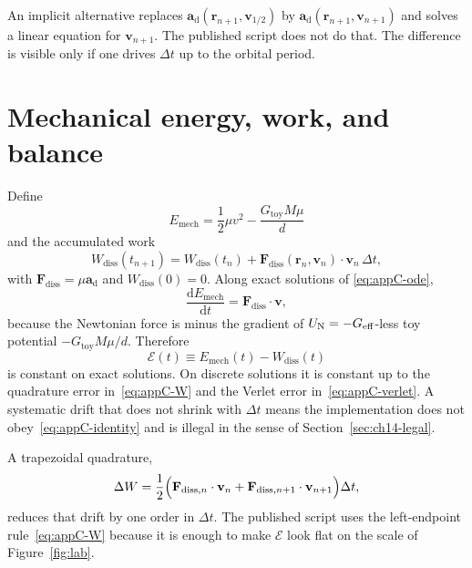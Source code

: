 An implicit alternative replaces
\(\mathbf{a}_{\mathrm{d}}(\mathbf{r}_{n+1},\mathbf{v}_{1/2})\)
by \(\mathbf{a}_{\mathrm{d}}(\mathbf{r}_{n+1},\mathbf{v}_{n+1})\)
and solves a linear equation for \(\mathbf{v}_{n+1}\). The
published script does not do that. The difference is visible only
if one drives \(\Delta t\) up to the orbital period.

\section{Mechanical energy, work, and balance}
\label{sec:appC-energy}

Define
\begin{equation}
  \label{eq:appC-E}
  E_{\mathrm{mech}}
  =\frac12\mu v^{2}-\frac{G_{\mathrm{toy}}M\mu}{d}
\end{equation}
and the accumulated work
\begin{equation}
  \label{eq:appC-W}
  W_{\mathrm{diss}}(t_{n+1})
  =W_{\mathrm{diss}}(t_n)
   +\mathbf{F}_{\mathrm{diss}}(\mathbf{r}_n,\mathbf{v}_n)
    \cdot\mathbf{v}_n\,\Delta t,
\end{equation}
with \(\mathbf{F}_{\mathrm{diss}}=\mu\mathbf{a}_{\mathrm{d}}\) and
\(W_{\mathrm{diss}}(0)=0\). Along exact solutions of
\eqref{eq:appC-ode},
\begin{equation}
  \label{eq:appC-identity}
  \frac{\mathrm{d}E_{\mathrm{mech}}}{\mathrm{d}t}
  =\mathbf{F}_{\mathrm{diss}}\cdot\mathbf{v},
\end{equation}
because the Newtonian force is minus the gradient of
\(U_{\mathrm{N}}=-G_{\mathrm{eff}}\)-less toy potential
\(-G_{\mathrm{toy}}M\mu/d\). Therefore
\begin{equation}
  \label{eq:appC-bal}
  \mathcal{E}(t)
  \equiv
  E_{\mathrm{mech}}(t)-W_{\mathrm{diss}}(t)
\end{equation}
is constant on exact solutions. On discrete solutions it is
constant up to the quadrature error in~\eqref{eq:appC-W} and the
Verlet error in~\eqref{eq:appC-verlet}. A systematic drift that
does not shrink with \(\Delta t\) means the implementation does
not obey~\eqref{eq:appC-identity} and is illegal in the sense of
Section~\ref{sec:ch14-legal}.

A trapezoidal quadrature,
\begin{equation}
  \label{eq:appC-trap}
  \Delta W
  =\frac12
   \Bigl(
     \mathbf{F}_{\mathrm{diss},n}\cdot\mathbf{v}_n
     +\mathbf{F}_{\mathrm{diss},n+1}\cdot\mathbf{v}_{n+1}
   \Bigr)\Delta t,
\end{equation}
reduces that drift by one order in \(\Delta t\). The published
script uses the left-endpoint rule~\eqref{eq:appC-W} because it
is enough to make \(\mathcal{E}\) look flat on the scale of
Figure~\ref{fig:lab}.

